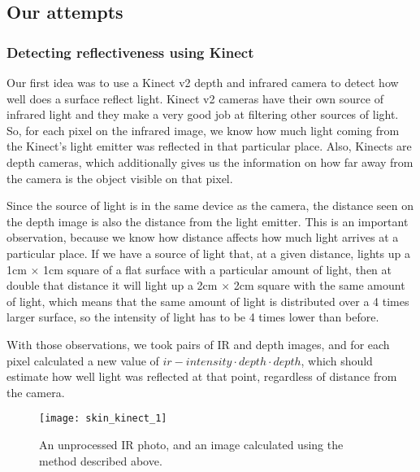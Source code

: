     \subsection{Our attempts}

        \subsubsection{Detecting reflectiveness using Kinect}
            Our first idea was to use a Kinect v2 depth and infrared camera to detect
            how well does a surface reflect light.
            Kinect v2 cameras have their own source of infrared light and they make
            a very good job at filtering other sources of light.
            So, for each pixel on the infrared image, we know how much light coming
            from the Kinect's light emitter was reflected in that particular place.
            Also, Kinects are depth cameras, which additionally gives us the information
            on how far away from the camera is the object visible on that pixel.

            Since the source of light is in the same device as the camera, the distance
            seen on the depth image is also the distance from the light emitter.
            This is an important observation, because we know how distance affects how
            much light arrives at a particular place. %
            If we have a source of light that, at a given distance, lights up a
            1cm $\times$ 1cm square of a flat surface with a particular amount
            of light, then at double that distance it will light up a 2cm $\times$ 2cm
            square with the same amount of light, which means that the same amount
            of light is distributed over a 4 times larger surface, so the
            intensity of light has to be 4 times lower than before.

            With those observations, we took pairs of IR and depth images, and for each
            pixel calculated a new value of $ir-intensity \cdot depth \cdot depth$,
            which should estimate how well light was reflected at that point,
            regardless of distance from the camera.

            \begin{figure}[H]
                \caption{An unprocessed IR photo, and an image calculated using
                the method described above.}
                \centering
                \texttt{[image: skin\_kinect\_1]}
                \label{fig:skin_kinect_1}
            \end{figure}

